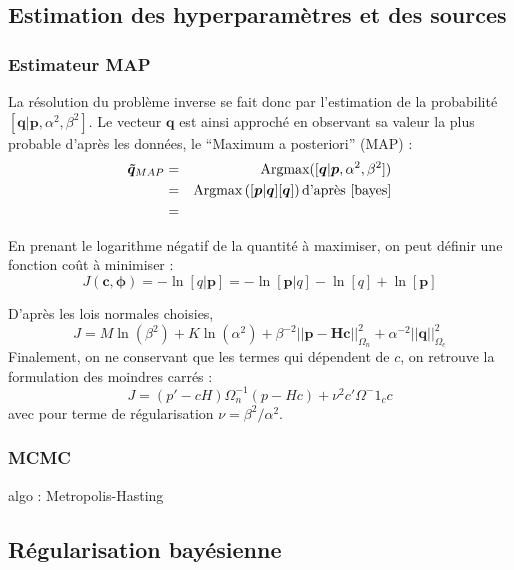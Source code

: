 \subsection{Estimation des hyperparamètres et des sources}
\subsubsection{Estimateur MAP}
La résolution du problème inverse se fait donc par l'estimation de la probabilité $[\bm{q}|\bm{p},\alpha^2,\beta^2]$. Le vecteur $\bm{q}$ est ainsi approché en observant sa valeur la plus probable d'après les données, le  ``Maximum a posteriori'' (MAP) : 
\begin{eqnarray}
\bm{\tilde{q}}_{MAP} &=& \text{Argmax}([\bm{q}|\bm{p},\alpha^2,\beta^2])\\
					 &=& \text{Argmax}\left( [\bm{p}|\bm{q}][\bm{q}]  \right) \text{d'après \ref{bayes}}\\
					 &=& 
\end{eqnarray}

En prenant le logarithme négatif de la quantité à maximiser, on peut définir une fonction coût à minimiser : 
\begin{equation}
	J(\bm{c},\bm{\phi}) = - \ln[q|\bm{p}] = -\ln[\bm{p}|q]-\ln[q]+\ln[\bm{p}]
\end{equation}

D'après les lois normales choisies, 
\begin{equation}
J=M\ln(\beta^2) + K\ln(\alpha^2) +\beta^{-2}||\bm{p}-\bm{Hc}||^2_{\Omega_n}+\alpha^{-2}||\bm{q}||^2_{\Omega_c}
\end{equation}
Finalement, on ne conservant que les termes qui dépendent de $c$, on retrouve la formulation des moindres carrés : 
\begin{equation}
 J = (p'-cH)\Omega^{-1}_n(p-Hc) + \nu^2c'\Omega^-1_c c
\end{equation}
avec pour terme de régularisation $\nu = \beta^2/\alpha^2$.





\subsubsection{MCMC}
algo : Metropolis-Hasting







\subsection{Régularisation bayésienne}

